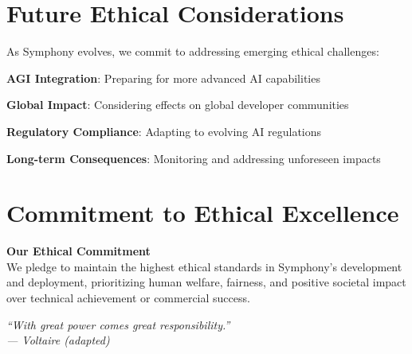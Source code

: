 \section*{Future Ethical Considerations}

As Symphony evolves, we commit to addressing emerging ethical challenges:

\begin{compactlist}
    \item \textbf{AGI Integration}: Preparing for more advanced AI capabilities
    \item \textbf{Global Impact}: Considering effects on global developer communities
    \item \textbf{Regulatory Compliance}: Adapting to evolving AI regulations
    \item \textbf{Long-term Consequences}: Monitoring and addressing unforeseen impacts
\end{compactlist}

\section*{Commitment to Ethical Excellence}

\begin{center}
\begin{tcolorbox}[
    colback=brandAccent!10,
    colframe=brandAccent,
    boxrule=2pt,
    arc=5pt,
    width=0.9\textwidth
]
\textbf{Our Ethical Commitment}\\[0.5em]
We pledge to maintain the highest ethical standards in Symphony's development and deployment, prioritizing human welfare, fairness, and positive societal impact over technical achievement or commercial success.
\end{tcolorbox}
\end{center}

\vspace{0.5cm}
\begin{center}
\textit{``With great power comes great responsibility.''}\\
\textit{— Voltaire (adapted)}
\end{center}

\clearpage
